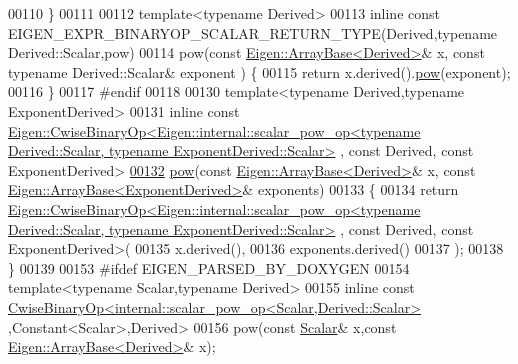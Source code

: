 \begin{DoxyCode}
00110   \}
00111 
00112   \textcolor{keyword}{template}<\textcolor{keyword}{typename} Derived>
00113   \textcolor{keyword}{inline} \textcolor{keyword}{const} EIGEN\_EXPR\_BINARYOP\_SCALAR\_RETURN\_TYPE(Derived,\textcolor{keyword}{typename} Derived::Scalar,pow)
00114   pow(\textcolor{keyword}{const} \hyperlink{group___core___module_class_eigen_1_1_array_base}{Eigen::ArrayBase<Derived>}& x, \textcolor{keyword}{const} \textcolor{keyword}{typename} Derived::Scalar& exponent
      ) \{
00115     \textcolor{keywordflow}{return} x.derived().\hyperlink{group___core___module_ab6dc101d82e8228a19a8840e3a29c1c9}{pow}(exponent);
00116   \}
00117 \textcolor{preprocessor}{#endif}
00118 
00130   \textcolor{keyword}{template}<\textcolor{keyword}{typename} Derived,\textcolor{keyword}{typename} ExponentDerived>
00131   \textcolor{keyword}{inline} \textcolor{keyword}{const} 
      \hyperlink{group___core___module_class_eigen_1_1_cwise_binary_op}{Eigen::CwiseBinaryOp<Eigen::internal::scalar\_pow\_op<typename Derived::Scalar, typename
       ExponentDerived::Scalar>}
      , \textcolor{keyword}{const} Derived, \textcolor{keyword}{const} ExponentDerived>
\hyperlink{group___core___module_acb769e1ab1d809abb77c7ab98021ad81}{00132}   \hyperlink{group___core___module_acb769e1ab1d809abb77c7ab98021ad81}{pow}(\textcolor{keyword}{const} \hyperlink{group___core___module_class_eigen_1_1_array_base}{Eigen::ArrayBase<Derived>}& x, \textcolor{keyword}{const} 
      \hyperlink{group___core___module_class_eigen_1_1_array_base}{Eigen::ArrayBase<ExponentDerived>}& exponents) 
00133   \{
00134     \textcolor{keywordflow}{return} 
      \hyperlink{group___core___module_class_eigen_1_1_cwise_binary_op}{Eigen::CwiseBinaryOp<Eigen::internal::scalar\_pow\_op<typename Derived::Scalar, typename
       ExponentDerived::Scalar>}
      , \textcolor{keyword}{const} Derived, \textcolor{keyword}{const} ExponentDerived>(
00135       x.derived(),
00136       exponents.derived()
00137     );
00138   \}
00139   
00153 \textcolor{preprocessor}{#ifdef EIGEN\_PARSED\_BY\_DOXYGEN}
00154   \textcolor{keyword}{template}<\textcolor{keyword}{typename} Scalar,\textcolor{keyword}{typename} Derived>
00155   \textcolor{keyword}{inline} \textcolor{keyword}{const} \hyperlink{group___core___module_class_eigen_1_1_cwise_binary_op}{CwiseBinaryOp<internal::scalar\_pow\_op<Scalar,Derived::Scalar>}
      ,Constant<Scalar>,Derived>
00156   pow(\textcolor{keyword}{const} \hyperlink{group___core___module_a5feed465b3a8e60c47e73ecce83e39a2}{Scalar}& x,\textcolor{keyword}{const} \hyperlink{group___core___module_class_eigen_1_1_array_base}{Eigen::ArrayBase<Derived>}& x);

\end{DoxyCode}
